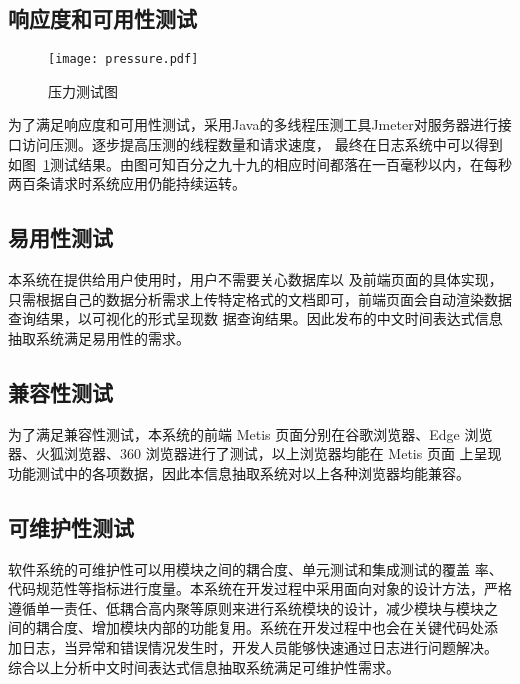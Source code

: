 \subsection{响应度和可用性测试}

\begin{figure}[b]
    \centering
    \texttt{[image: pressure.pdf]}
    \caption{压力测试图}
    \label{fig:pressure}
\end{figure}

为了满足响应度和可用性测试，采用Java的多线程压测工具Jmeter对服务器进行接口访问压测。逐步提高压测的线程数量和请求速度，
最终在日志系统中可以得到如图~\ref{fig:pressure}测试结果。由图可知百分之九十九的相应时间都落在一百毫秒以内，在每秒两百条请求时系统应用仍能持续运转。


\subsection{易用性测试}

本系统在提供给用户使用时，用户不需要关心数据库以
及前端页面的具体实现，只需根据自己的数据分析需求上传特定格式的文档即可，前端页面会自动渲染数据查询结果，以可视化的形式呈现数
据查询结果。因此发布的中文时间表达式信息抽取系统满足易用性的需求。

\subsection{兼容性测试}

为了满足兼容性测试，本系统的前端 Metis 页面分别在谷歌浏览器、Edge
浏览器、火狐浏览器、360 浏览器进行了测试，以上浏览器均能在 Metis 页面
上呈现功能测试中的各项数据，因此本信息抽取系统对以上各种浏览器均能兼容。

\subsection{可维护性测试}

软件系统的可维护性可以用模块之间的耦合度、单元测试和集成测试的覆盖
率、代码规范性等指标进行度量。本系统在开发过程中采用面向对象的设计方法，严格
遵循单一责任、低耦合高内聚等原则来进行系统模块的设计，减少模块与模块之
间的耦合度、增加模块内部的功能复用。系统在开发过程中也会在关键代码处添
加日志，当异常和错误情况发生时，开发人员能够快速通过日志进行问题解决。
综合以上分析中文时间表达式信息抽取系统满足可维护性需求。



